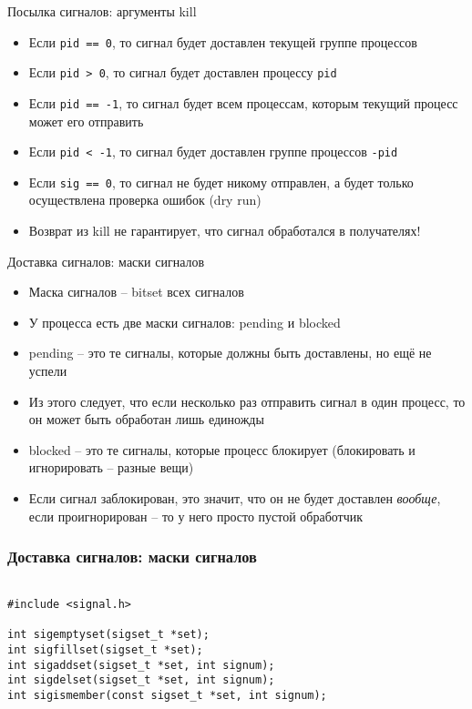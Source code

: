\documentclass[10pt,pdf,hyperref={unicode}]{beamer}
\begin{document}
\begin{frame}{Посылка сигналов: аргументы kill}
\begin{itemize}
    \item Если \texttt{pid == 0}, то сигнал будет доставлен текущей группе процессов
    \item Если \texttt{pid > 0}, то сигнал будет доставлен процессу \texttt{pid}
    \item Если \texttt{pid == -1}, то сигнал будет всем процессам, которым текущий процесс может его отправить
    \item Если \texttt{pid < -1}, то сигнал будет доставлен группе процессов \texttt{-pid}
    \item Если \texttt{sig == 0}, то сигнал не будет никому отправлен, а будет только осуществлена проверка ошибок (dry run)
    \item Возврат из kill не гарантирует, что сигнал обработался в получателях!
\end{itemize}
\end{frame}

\begin{frame}{Доставка сигналов: маски сигналов}
\begin{itemize}
    \item Маска сигналов -- bitset всех сигналов
    \item У процесса есть две маски сигналов: pending и blocked
    \item pending -- это те сигналы, которые должны быть доставлены, но ещё не успели
    \item Из этого следует, что если несколько раз отправить сигнал в один процесс, то он может быть обработан лишь единожды
    \item blocked -- это те сигналы, которые процесс блокирует (блокировать и игнорировать -- разные вещи)
    \item Если сигнал заблокирован, это значит, что он не будет доставлен \emph{вообще}, если проигнорирован -- то у него просто пустой обработчик
\end{itemize}
\end{frame}

\begin{frame}[fragile]
\frametitle{Доставка сигналов: маски сигналов}
\begin{center}
\begin{minipage}{0.95\textwidth}
\begin{verbatim}

#include <signal.h>

int sigemptyset(sigset_t *set);
int sigfillset(sigset_t *set);
int sigaddset(sigset_t *set, int signum);
int sigdelset(sigset_t *set, int signum);
int sigismember(const sigset_t *set, int signum);

\end{verbatim}
\end{minipage}
\end{center}
\end{frame}
\end{document}
